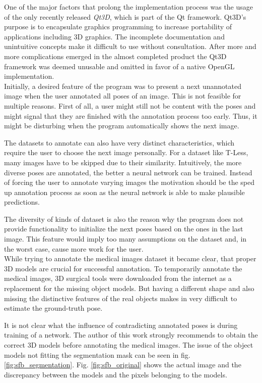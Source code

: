 One of the major factors that prolong the implementation process was the usage of the only recently released \textit{Qt3D}, which is part of the Qt framework. Qt3D's purpose is to encapsulate graphics programming to increase portability of applications including 3D graphics. The incomplete documentation and unintuitive concepts make it difficult to use without consultation. After more and more complications emerged in the almost completed product the Qt3D framework was deemed unusable and omitted in favor of a native OpenGL implementation. \\

Initially, a desired feature of the program was to present a next unannotated image when the user annotated all poses of an image. This is not feasible for multiple reasons. First of all, a user might still not be content with the poses and might signal that they are finished with the annotation process too early. Thus, it might be disturbing when the program automatically shows the next image. 

The datasets to annotate can also have very distinct characteristics, which require the user to choose the next image personally. For a dataset like T-Less, many images have to be skipped due to their similarity. Intuitively, the more diverse poses are annotated, the better a neural network can be trained. Instead of forcing the user to annotate varying images the motivation should be the sped up annotation process as soon as the neural network is able to make plausible predictions. 

The diversity of kinds of dataset is also the reason why the program does not provide functionality to initialize the next poses based on the ones in the last image. This feature would imply too many assumptions on the dataset and, in the worst case, cause more work for the user. \\

While trying to annotate the medical images dataset it became clear, that proper 3D models are crucial for successful annotation. To temporarily annotate the medical images, 3D surgical tools were downloaded from the internet as a replacement for the missing object models. But having a different shape and also missing the distinctive features of the real objects makes in very difficult to estimate the ground-truth pose. 

It is not clear what the influence of contradicting annotated poses is during training of a network. The author of this work strongly recommends to obtain the correct 3D models before annotating the medical images. The issue of the object models not fitting the segmentation mask can be seen in fig. \ref{fig:sfb_segmentation}. Fig. \ref{fig:sfb_original} shows the actual image and the discrepancy between the models and the pixels belonging to the models. \\

